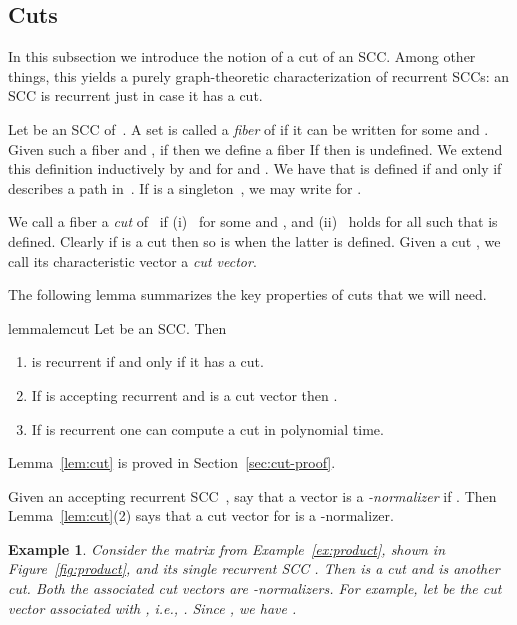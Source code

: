 \documentclass{elsarticle}
\newtheorem{example}[definition]{Example}
\begin{document}
\subsection{Cuts}
\label{sub:cut}
In this subsection we introduce the notion of a cut of an SCC.
Among other things, this yields a purely graph-theoretic
characterization of recurrent SCCs: an SCC is recurrent just in case
it has a cut.

Let  be an SCC of~.  A set
 is called a \emph{fiber} of  if it can be
written  for some  and
.  Given such a fiber  and , if 
then we define a fiber
 If  then  is undefined.  We extend
this definition inductively by
 and
 for  and
.
We have that  is defined if and only if  describes a path in~.
If  is a singleton~, we may write  for .


  We call a fiber  a \emph{cut} of~ if
  (i)~ for some  and ,
  and (ii)~ holds for all  such that
   is defined.
Clearly if  is a cut then so is  when the
latter is defined.  Given a cut , we call its
characteristic vector  a \emph{cut vector}.

The following lemma summarizes the key properties of cuts that we will need.\begin{restatable}{lemma}{lemcut}\label{lem:cut}\label{LEM:CUT}
Let  be an SCC.  Then
\begin{enumerate}
\item  is recurrent if and only if it has a cut.
\item If  is accepting recurrent and  is a cut vector then .
\item If  is recurrent one can compute a cut in polynomial time.
\end{enumerate}
\end{restatable}
\noindent Lemma~\ref{lem:cut} is proved in Section~\ref{sec:cut-proof}.

Given an accepting recurrent SCC~, say that a vector  is a
\emph{-normalizer} if .  Then
Lemma~\ref{lem:cut}(2) says that a cut vector for  is a
-normalizer.

\begin{example}
  Consider the matrix  from Example~\ref{ex:product}, shown in
  Figure~\ref{fig:product}, and its single recurrent SCC .  Then
   is a cut and
   is another cut.  Both
  the associated cut vectors are -normalizers.
  For  example, let  be the cut vector associated with , i.e., .
  Since , we have .
\end{example}
\end{document}
